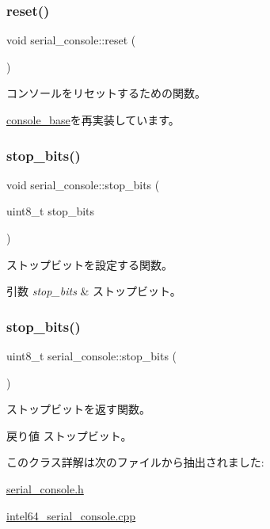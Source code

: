 \subsubsection{\texorpdfstring{reset()}{reset()}}
{\footnotesize\ttfamily void serial\+\_\+console\+::reset (\begin{DoxyParamCaption}{ }\end{DoxyParamCaption})\hspace{0.3cm}{\ttfamily [virtual]}}

コンソールをリセットするための関数。 

\hyperlink{classconsole__base_a79693833fdcd6b83c6b9a18919355bb3}{console\+\_\+base}を再実装しています。

\hypertarget{classserial__console_a556085cc185db329b9fb2c1637c17268}{}\label{classserial__console_a556085cc185db329b9fb2c1637c17268} 
\subsubsection{\texorpdfstring{stop\+\_\+bits()}{stop\_bits()}\hspace{0.1cm}{\footnotesize\ttfamily [1/2]}}
{\footnotesize\ttfamily void serial\+\_\+console\+::stop\+\_\+bits (\begin{DoxyParamCaption}\item[{uint8\+\_\+t}]{stop\+\_\+bits }\end{DoxyParamCaption})}

ストップビットを設定する関数。 
\begin{DoxyParams}{引数}
{\em stop\+\_\+bits} & ストップビット。 \\
\hline
\end{DoxyParams}
\hypertarget{classserial__console_a43039f134f5b5b666b3a42a8fdad1484}{}\label{classserial__console_a43039f134f5b5b666b3a42a8fdad1484} 
\subsubsection{\texorpdfstring{stop\+\_\+bits()}{stop\_bits()}\hspace{0.1cm}{\footnotesize\ttfamily [2/2]}}
{\footnotesize\ttfamily uint8\+\_\+t serial\+\_\+console\+::stop\+\_\+bits (\begin{DoxyParamCaption}{ }\end{DoxyParamCaption})}

ストップビットを返す関数。 \begin{DoxyReturn}{戻り値}
ストップビット。 
\end{DoxyReturn}


このクラス詳解は次のファイルから抽出されました\+:\begin{DoxyCompactItemize}
\item 
\hyperlink{serial__console_8h}{serial\+\_\+console.\+h}\item 
\hyperlink{intel64__serial__console_8cpp}{intel64\+\_\+serial\+\_\+console.\+cpp}\end{DoxyCompactItemize}
